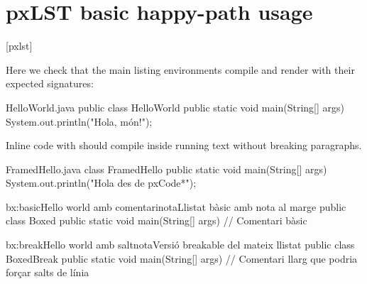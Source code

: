 \documentclass{P3CTeX}
\begin{document}
\section*{pxLST basic happy-path usage}

[pxlst]

Here we check that the main listing environments compile and render with
their expected signatures:

\begin{pxCode}[language=pxJava]{HelloWorld.java}
public class HelloWorld {
  public static void main(String[] args) {
    System.out.println("Hola, món!");
  }
}
\end{pxCode}

Inline code with  should compile inside
running text without breaking paragraphs.

\begin{pxCode*}[language=pxJava]{FramedHello.java}
class FramedHello {
  public static void main(String[] args) {
    System.out.println("Hola des de pxCode*");
  }
}
\end{pxCode*}

\begin{CodeBox}[language=pxJava]{bx:basic}{Hello world amb comentari}{nota}{Llistat bàsic amb nota al marge}
public class Boxed {
  public static void main(String[] args) {
    // Comentari bàsic
  }
}
\end{CodeBox}

\begin{CodeBox*}[language=pxJava]{bx:break}{Hello world amb salt}{nota}{Versió breakable del mateix llistat}
public class BoxedBreak {
  public static void main(String[] args) {
    // Comentari llarg que podria forçar salts de línia
  }
}
\end{CodeBox*}

\end{document}

